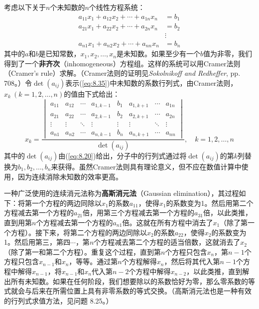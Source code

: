     考虑以下关于$n$个未知数的$n$个线性方程系统：
    \begin{equation}
        \begin{aligned}
            a_{11}x_1 + a_{12}x_2 + \cdots + a_{1n}x_n &= b_1 \\
            a_{21}x_1 + a_{22}x_2 + \cdots + a_{2n}x_n &= b_2 \\
            &\vdots \\
            a_{n1}x_1 + a_{n2}x_2 + \cdots + a_{nn}x_n &= b_n
        \end{aligned}
        \label{eq:8.35}
    \end{equation}
    其中的$a$和$b$是已知常数，$x_1,x_2,\ldots,x_n$是未知数。如果至少有一个$b$值为非零，我们得到了一个\textbf{非齐次}（inhomogeneous）方程组。这样的系统可以用Cramer法则（Cramer's rule）求解。（Cramer法则的证明见\textit{Sokolnikoff and Redheffer}, pp. 708。）令$\det\left(a_{ij}\right)$表示(\ref{eq:8.35})中未知数的系数行列式，由Cramer法则，$x_k \: \left(k = 1,2,\ldots,n\right)$的值由下式给出：
    \begin{equation}
        x_k = \frac{
            \begin{vmatrix}
                a_{11} & a_{12} & \cdots & a_{1,k-1} & b_1 & a_{1,k+1} & \cdots & a_{1n} \\
                a_{21} & a_{22} & \cdots & a_{2,k-1} & b_2 & a_{2,k+1} & \cdots & a_{2n} \\
                \vdots & \vdots & \ddots & \vdots & \vdots & \vdots & \ddots & \vdots \\
                a_{n1} & a_{n2} & \cdots & a_{n,k-1} & b_n & a_{n,k+1} & \cdots & a_{nn}
            \end{vmatrix}
        }{\det\left(a_{ij}\right)}, \quad k = 1,2,\ldots,n
        \label{eq:8.36}
    \end{equation}
    其中的$\det\left(a_{ij}\right)$由(\ref{eq:8.20})给出，分子中的行列式通过将$\det\left(a_{ij}\right)$的第$k$列替换为$b_1,b_2,\ldots,b_n$来获得。虽然Cramer法则具有理论意义，但不应在数值计算中使用，因为连续消除未知数的效率更高。

    一种广泛使用的连续消元法称为\textbf{高斯消元法}（Gaussian elimination），其过程如下：将第一个方程的两边同除以$x_1$的系数$a_{11}$，使得$x_1$的系数变为1。然后用第二个方程减去第一个方程的$a_{21}$倍，用第三个方程减去第一个方程的$a_{31}$倍，以此类推，直到用第$n$个方程减去第一个方程的$a_{n1}$倍。这就在所有方程中消去了$x_1$（除了第一个方程）。接下来，将第二个方程的两边同除以$x_2$的系数$a_{22}$，使得$x_2$的系数变为1。然后用第三，第四$\cdots$，第$n$个方程减去第二个方程的适当倍数，这就消去了$x_2$（除了第一和第二个方程）。重复这个过程，直到第$n$个方程只包含$x_n$，第$n-1$个方程只包含$x_{n-1}$和$x_n$，等等。通过第$n$个方程解得$x_n$，然后将其代入第$n-1$个方程中解得$x_{n-1}$，将$x_{n-1}$和$x_n$代入第$n-2$个方程中解得$x_{n-2}$，以此类推，直到解出所有未知数。如果在任何阶段，我们想要除以的系数恰好为零，那么零系数的等式就会与后来在所需位置上具有非零系数的等式交换。（高斯消元法也是一种有效的行列式求值方法，见问题 8.25。）

